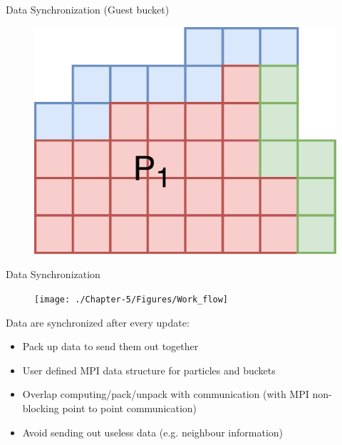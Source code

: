 \documentclass{beamer}
\begin{document}
\begin{frame}{Data Synchronization (Guest bucket)}
\begin{minipage}[b]{0.25\textwidth}
\begin{figure}
\includegraphics[width=\textwidth]{./PPT/Data_Syn_P1}
\end{figure}
\end{minipage}
\end{frame}

\begin{frame}{Data Synchronization}

\begin{minipage}{0.38\textwidth}
\begin{figure}
\flushleft
\texttt{[image: ./Chapter-5/Figures/Work\_flow]}
\end{figure}
\end{minipage}
\begin{minipage}{0.61\textwidth}
Data are synchronized after every update:

\begin{itemize}
\item Pack up data to send them out together
\item User defined MPI data structure for particles and buckets
\item Overlap computing/pack/unpack with communication (with MPI non-blocking point to point communication)
\item Avoid sending out useless data (e.g. neighbour information)
\end{itemize}
\end{minipage}

\end{frame}
\end{document}
